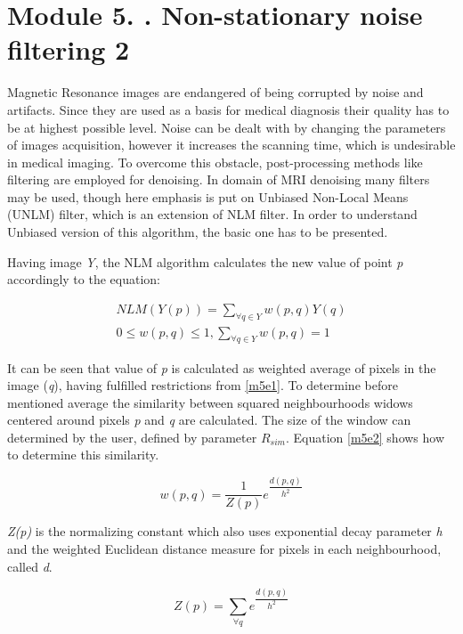 \section{Module 5. . Non-stationary noise filtering 2}

Magnetic Resonance images are endangered of being corrupted by noise
and artifacts. Since they are used as a basis for medical diagnosis
their quality has to be at highest possible level. Noise can be dealt
with by changing the parameters of images acquisition, however it
increases the scanning time, which is undesirable in medical imaging.
To overcome this obstacle, post-processing methods like filtering
are employed for denoising. In domain of MRI denoising many filters
may be used, though here emphasis is put on Unbiased Non-Local Means
(UNLM) filter, which is an extension of NLM filter. In order to understand
Unbiased version of this algorithm, the basic one has to be presented.

Having image \textit{Y}, the NLM algorithm calculates the new value
of point \textit{p} accordingly to the equation:

\begin{equation}
\begin{aligned}NLM(Y(p))=\sum_{\forall q\in Y}^ {}w(p,q)Y(q)\\
0\le w(p,q)\le1,\sum_{\forall q\in Y}^ {}w(p,q)=1
\end{aligned}
\label{m5e1}
\end{equation}

It can be seen that value of \textit{p} is calculated as weighted
average of pixels in the image (\textit{q}), having fulfilled restrictions
from \ref{m5e1}. To determine before mentioned average the similarity
between squared neighbourhoods widows centered around pixels \textit{p}
and \textit{q} are calculated. The size of the window can determined
by the user, defined by parameter $R_{sim}$. Equation \ref{m5e2}
shows how to determine this similarity.

\begin{equation}
w(p,q)=\frac{1}{Z(p)}e^{\dfrac{d(p,q)}{h^{2}}}\label{m5e2}
\end{equation}

\textit{Z(p)} is the normalizing constant which also uses exponential
decay parameter \textit{h} and the weighted Euclidean distance measure
for pixels in each neighbourhood, called \textit{d}.

\begin{equation}
Z(p)=\sum_{\forall q}^ {}e^{\dfrac{d(p,q)}{h^{2}}}\label{m5e5}
\end{equation}

